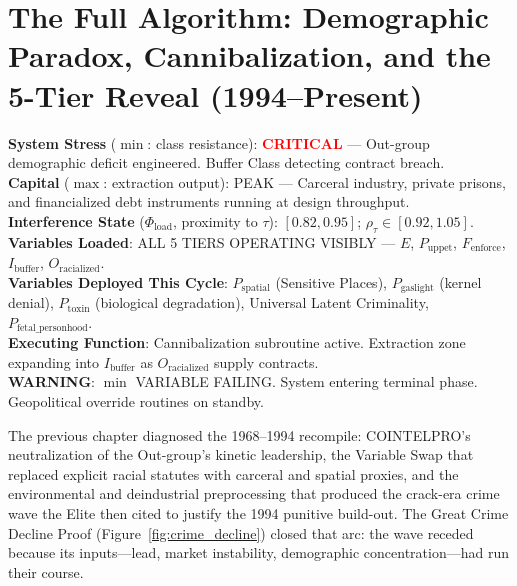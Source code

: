 \chapter{The Full Algorithm: Demographic Paradox, Cannibalization, and the 5-Tier Reveal (1994--Present)}
\label{ch:full_algo}

\begin{tcolorbox}[colback=black!5, colframe=black!70, fonttitle=\bfseries\ttfamily, title=RUNTIME LOG: 1994--PRESENT (TERMINAL RUNTIME)]
\ttfamily\small
\textbf{System Stress} ($\min$: class resistance): \textcolor{red}{\textbf{CRITICAL}} --- Out-group demographic deficit engineered. Buffer Class detecting contract breach.\\
\textbf{Capital} ($\max$: extraction output): PEAK --- Carceral industry, private prisons, and financialized debt instruments running at design throughput.\\
\textbf{Interference State} ($\Phi_{\text{load}}$, proximity to $\tau$): $[0.82, 0.95]$; $\rho_{\tau} \in [0.92, 1.05]$.\\
\textbf{Variables Loaded}: ALL 5 TIERS OPERATING VISIBLY --- $E$, $P_{\text{uppet}}$, $F_{\text{enforce}}$, $I_{\text{buffer}}$, $O_{\text{racialized}}$.\\
\textbf{Variables Deployed This Cycle}: $P_{\text{spatial}}$ (Sensitive Places), $P_{\text{gaslight}}$ (kernel denial), $P_{\text{toxin}}$ (biological degradation), Universal Latent Criminality, $P_{\text{fetal\_personhood}}$.\\
\textbf{Executing Function}: Cannibalization subroutine active. Extraction zone expanding into $I_{\text{buffer}}$ as $O_{\text{racialized}}$ supply contracts.\\
\textbf{WARNING}: $\min$ VARIABLE FAILING. System entering terminal phase. Geopolitical override routines on standby.
\end{tcolorbox}

\medskip

The previous chapter diagnosed the 1968--1994 recompile: COINTELPRO's neutralization of the Out-group's kinetic leadership, the Variable Swap that replaced explicit racial statutes with carceral and spatial proxies, and the environmental and deindustrial preprocessing that produced the crack-era crime wave the Elite then cited to justify the 1994 punitive build-out. The Great Crime Decline Proof (Figure~\ref{fig:crime_decline}) closed that arc: the wave receded because its inputs---lead, market instability, demographic concentration---had run their course.

